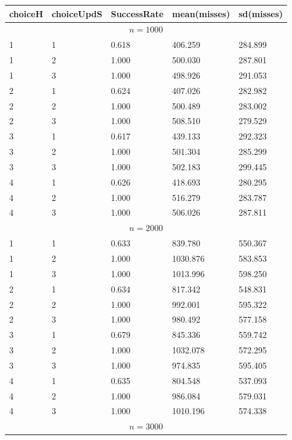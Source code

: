 \documentclass[11pt,a4paper,draft]{article}
\begin{document}
\begin{description}
	\begin{figure}[!h]
		\centering
		\begin{tabular}{lllll}
			\hline \hline 
			choiceH & choiceUpdS & SuccessRate & mean(misses) & sd(misses) \\
			\hline \hline 
			\multicolumn{5}{c}{$n = 1000$} \\ 
			\hline 
			1 & 1 &  0.618 & 406.259 & 284.899 \\
			1 & 2 &  1.000 & 500.030 & 287.801 \\
			1 & 3 &  1.000 & 498.926 & 291.053 \\
			\hline 
			2 & 1 &  0.624 & 407.026 & 282.982 \\
			2 & 2 &  1.000 & 500.489 & 283.002 \\
			2 & 3 &  1.000 & 508.510 & 279.529 \\
			\hline 
			3 & 1 &  0.617 & 439.133 & 292.323 \\
			3 & 2 &  1.000 & 501.304 & 285.299 \\
			3 & 3 &  1.000 & 502.183 & 299.445 \\
			\hline 
			4 & 1 &  0.626 & 418.693 & 280.295 \\
			4 & 2 &  1.000 & 516.279 & 283.787 \\
			4 & 3 &  1.000 & 506.026 & 287.811 \\
			\hline 
			\hline 
			\multicolumn{5}{c}{$n = 2000$} \\ 
			\hline 
			1 & 1 &  0.633 & 839.780 & 550.367 \\
			1 & 2 &  1.000 & 1030.876 & 583.853 \\
			1 & 3 &  1.000 & 1013.996 & 598.250 \\
			\hline 
			2 & 1 &  0.634 & 817.342 & 548.831 \\
			2 & 2 &  1.000 & 992.001 & 595.322 \\
			2 & 3 &  1.000 & 980.492 & 577.158 \\
			\hline 
			3 & 1 &  0.679 & 845.336 & 559.742 \\
			3 & 2 &  1.000 & 1032.078 & 572.295 \\
			3 & 3 &  1.000 & 974.835 & 595.405 \\
			\hline 
			4 & 1 &  0.635 & 804.548 & 537.093 \\
			4 & 2 &  1.000 & 986.084 & 579.031 \\
			4 & 3 &  1.000 & 1010.196 & 574.338 \\
			\hline 
			\hline 
			\multicolumn{5}{c}{$n = 3000$} \\ 
			\hline 

\end{tabular}
\end{figure}
\end{description}
\end{document}
